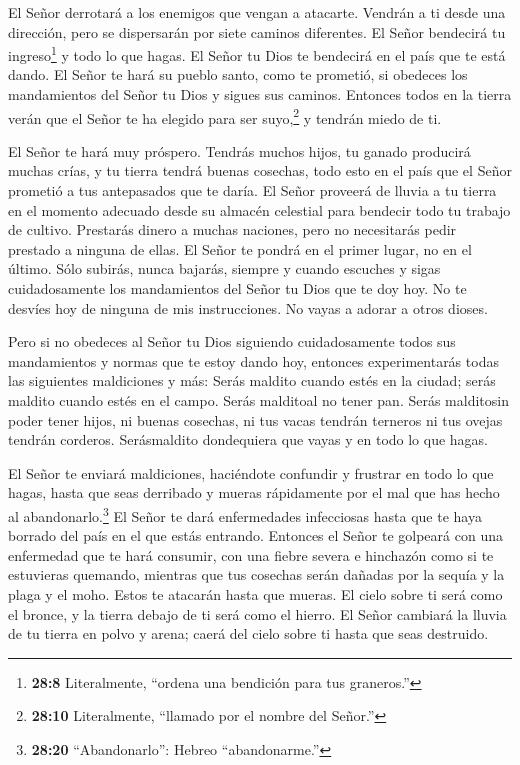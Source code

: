  El Señor derrotará a los enemigos que vengan a atacarte.
Vendrán a ti desde una dirección, pero se dispersarán por siete caminos
diferentes.  El Señor bendecirá tu ingreso\footnote{\textbf{28:8}
  Literalmente, ``ordena una bendición para tus graneros.''} y todo lo
que hagas. El Señor tu Dios te bendecirá en el país que te está dando.
 El Señor te hará su pueblo santo, como te prometió, si
obedeces los mandamientos del Señor tu Dios y sigues sus caminos.
 Entonces todos en la tierra verán que el Señor te ha
elegido para ser suyo,\footnote{\textbf{28:10} Literalmente, ``llamado
  por el nombre del Señor.''} y tendrán miedo de ti.

 El Señor te hará muy próspero. Tendrás muchos hijos, tu
ganado producirá muchas crías, y tu tierra tendrá buenas cosechas, todo
esto en el país que el Señor prometió a tus antepasados que te daría.
 El Señor proveerá de lluvia a tu tierra en el momento
adecuado desde su almacén celestial para bendecir todo tu trabajo de
cultivo. Prestarás dinero a muchas naciones, pero no necesitarás pedir
prestado a ninguna de ellas.  El Señor te pondrá en el
primer lugar, no en el último. Sólo subirás, nunca bajarás, siempre y
cuando escuches y sigas cuidadosamente los mandamientos del Señor tu
Dios que te doy hoy.  No te desvíes hoy de ninguna de mis
instrucciones. No vayas a adorar a otros dioses.

 Pero si no obedeces al Señor tu Dios siguiendo
cuidadosamente todos sus mandamientos y normas que te estoy dando hoy,
entonces experimentarás todas las siguientes maldiciones y más:
 Serás maldito cuando estés en la ciudad; serás maldito
cuando estés en el campo.  Serás malditoal no tener pan.
 Serás malditosin poder tener hijos, ni buenas cosechas, ni
tus vacas tendrán terneros ni tus ovejas tendrán corderos. 
Serásmaldito dondequiera que vayas y en todo lo que hagas.

 El Señor te enviará maldiciones, haciéndote confundir y
frustrar en todo lo que hagas, hasta que seas derribado y mueras
rápidamente por el mal que has hecho al abandonarlo.\footnote{\textbf{28:20}
  ``Abandonarlo'': Hebreo ``abandonarme.''}  El Señor te
dará enfermedades infecciosas hasta que te haya borrado del país en el
que estás entrando.  Entonces el Señor te golpeará con una
enfermedad que te hará consumir, con una fiebre severa e hinchazón como
si te estuvieras quemando, mientras que tus cosechas serán dañadas por
la sequía y la plaga y el moho. Estos te atacarán hasta que mueras.
 El cielo sobre ti será como el bronce, y la tierra debajo
de ti será como el hierro.  El Señor cambiará la lluvia de
tu tierra en polvo y arena; caerá del cielo sobre ti hasta que seas
destruido.

